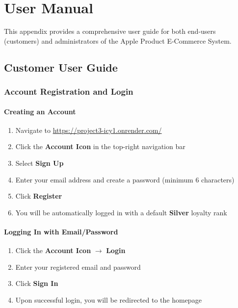 \documentclass[12pt, a4paper]{report}
\begin{document}
{{%

\chapter{User Manual}
\label{app:usermanual}

This appendix provides a comprehensive user guide for both end-users (customers) and administrators of the Apple Product E-Commerce System.

\section{Customer User Guide}

\subsection{Account Registration and Login}

\subsubsection{Creating an Account}

\begin{enumerate}
    \item Navigate to \url{https://project3-icy1.onrender.com/}
    \item Click the \textbf{Account Icon} in the top-right navigation bar
    \item Select \textbf{Sign Up}
    \item Enter your email address and create a password (minimum 6 characters)
    \item Click \textbf{Register}
    \item You will be automatically logged in with a default \textbf{Silver} loyalty rank
\end{enumerate}

\subsubsection{Logging In with Email/Password}

\begin{enumerate}
    \item Click the \textbf{Account Icon} $\rightarrow$ \textbf{Login}
    \item Enter your registered email and password
    \item Click \textbf{Sign In}
    \item Upon successful login, you will be redirected to the homepage
\end{enumerate}

}}
\end{document}

